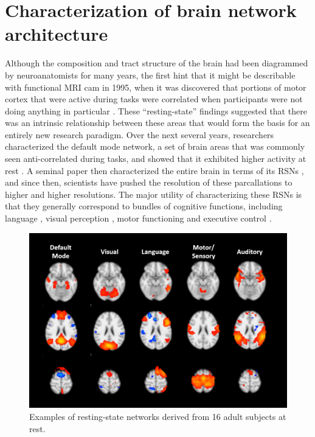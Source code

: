 \section{Characterization of brain network architecture}

Although the composition and tract structure of the brain had been diagrammed by neuroanatomists for many years, the first hint that it might be describable with functional MRI cam in 1995, when it was discovered that portions of motor cortex that were active during tasks were correlated when participants were not doing anything in particular \citep{Biswal1995}. These ``resting-state'' findings suggested that there was an intrinsic relationship between these areas that would form the basis for an entirely new research paradigm. Over the next several years, researchers characterized the default mode network, a set of brain areas that was commonly seen anti-correlated during tasks, and showed that it exhibited higher activity at rest \citep{Greicius2003}. A seminal paper then characterized the entire brain in terms of its RSNs \citep{Yeo2011}, and since then, scientists have pushed the resolution of these parcallations to higher and higher resolutions. The major utility of characterizing these RSNs is that they generally correspond to bundles of cognitive functions, including language \citep{Cordes2000, Hampson2002}, visual perception \citep{Simmons2012}, motor functioning \citep{Biswal1995} and executive control \citep{Seeley2007}. 

\begin{figure}[t]
    \centering
    \includegraphics[height=3in]{images/ch1-ica.png}
    \caption[Examples of resting-state networks.]{Examples of resting-state networks derived from 16 adult subjects at rest.}
    \label{fig:ch1-ica}
\end{figure}

